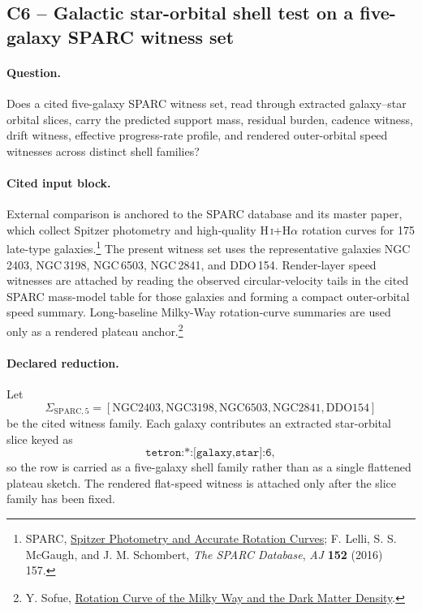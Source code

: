 \subsection{C6 -- Galactic star-orbital shell test on a five-galaxy SPARC witness set}\label{suppc:c6-galactic-orbital}
\paragraph{Question.} Does a cited five-galaxy SPARC witness set, read through extracted galaxy--star orbital slices, carry the predicted support mass, residual burden, cadence witness, drift witness, effective progress-rate profile, and rendered outer-orbital speed witnesses across distinct shell families?

\paragraph{Cited input block.} External comparison is anchored to the SPARC database and its master paper, which collect Spitzer photometry and high-quality H\,\textsc{i}+H$\alpha$ rotation curves for 175 late-type galaxies.\footnote{SPARC, \href{https://astroweb.case.edu/SPARC/}{Spitzer Photometry and Accurate Rotation Curves}; F. Lelli, S. S. McGaugh, and J. M. Schombert, \emph{The SPARC Database}, \emph{AJ} \textbf{152} (2016) 157.} The present witness set uses the representative galaxies NGC\,2403, NGC\,3198, NGC\,6503, NGC\,2841, and DDO\,154. Render-layer speed witnesses are attached by reading the observed circular-velocity tails in the cited SPARC mass-model table for those galaxies and forming a compact outer-orbital speed summary. Long-baseline Milky-Way rotation-curve summaries are used only as a rendered plateau anchor.\footnote{Y. Sofue, \href{https://www.ioa.s.u-tokyo.ac.jp/~sofue/papers/sofcomp/2020-galax-RC-DM-MW-Review.pdf}{Rotation Curve of the Milky Way and the Dark Matter Density}.}

\paragraph{Declared reduction.} Let
\[
\Sigma_{\mathrm{SPARC},5} = [\mathrm{NGC2403},\mathrm{NGC3198},\mathrm{NGC6503},\mathrm{NGC2841},\mathrm{DDO154}]
\]
be the cited witness family. Each galaxy contributes an extracted star-orbital slice keyed as
\[
\texttt{tetron:*:[galaxy,star]:6},
\]
so the row is carried as a five-galaxy shell family rather than as a single flattened plateau sketch. The rendered flat-speed witness is attached only after the slice family has been fixed.

